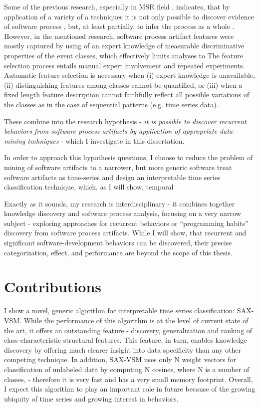Some of the previous research, especially in MSR field  \cite{citeulike:9114115, citeulike:7853299}, 
indicates, that by application of a variety of a techniques it is not only possible to discover evidence of 
software process \cite{citeulike:9007622}, but, at least partially, to infer the process as a 
whole \cite{citeulike:5128808}. However, in the mentioned research, software process artifact features 
were mostly captured by using of an expert knowledge of measurable discriminative properties of the 
event classes, which effectively limits analyses to The feature selection
process entails manual expert involvement and repeated experiments. Automatic feature
selection is necessary when (i) expert knowledge is unavailable, (ii) distinguishing features
among classes cannot be quantified, or (iii) when a fixed length feature description cannot
faithfully reflect all possible variations of the classes as in the case of sequential patterns
(e.g. time series data).

These combine into the research hypothesis - \textit{it is possible to discover recurrent behaviors 
from software process artifacts by application of appropriate data-mining techniques} - 
which I investigate in this dissertation. 

In order to approach this hypothesis questions, I choose to reduce the problem of mining of software artifacts to a narrower,
but more generic software treat software artifacts as time-series and design an interpretable time 
series classification technique, which, 
as I will show, temporal 


Exactly as it sounds, my research is interdisciplinary - it combines together knowledge discovery and software process 
analysis, focusing on a very narrow subject - exploring approaches for recurrent behaviors or ``programming habits'' 
discovery from software process artifacts.
While I will show, that recurrent and significant software-development behaviors can be discovered,
their precise categorization, effect, and performance are beyond the scope of this thesis.

\section{Contributions}\label{section_contributions}
I show a novel, generic algorithm for interpretable time series classification: SAX-VSM. 
While the performance of this algorithm is at the level of current state of the art, it offers an outstanding feature -
discovery, generalization and ranking of class-characteristic structural features. This feature, in turn, enables
knowledge discovery by offering much clearer insight into data specificity than any other competing technique.
In addition, SAX-VSM uses only N weight vectors for classification of unlabeled data by computing N cosines, where N is
a number of classes, - therefore it is very fast and has a very small memory footprint.
Overall, I expect this algorithm to play an important role in future because of the growing ubiquity of time series and
growing interest in behaviors.

